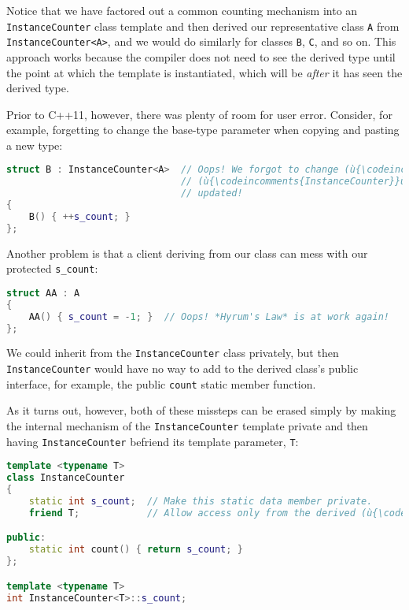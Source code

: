 \noindent Notice that we have factored out a common counting mechanism into an
\texttt{InstanceCounter} class template and then derived our
representative class \texttt{A} from \texttt{InstanceCounter<A>}, and we
would do similarly for classes \texttt{B}, \texttt{C}, and so on. This
approach works because the compiler does not need to see the derived
type until the point at which the template is instantiated, which will
be \emph{after} it has seen the derived type.

Prior to C++11, however, there was plenty of room for user error.
Consider, for example, forgetting to change the base-type parameter when
copying and pasting a new type:

\begin{lstlisting}[language=C++]
struct B : InstanceCounter<A>  // Oops! We forgot to change (ù{\codeincomments{A}}ù) to (ù{\codeincomments{B}}ù) in
                               // (ù{\codeincomments{InstanceCounter}}ù): The wrong count will be
                               // updated!
{
    B() { ++s_count; }
};
\end{lstlisting}
    
\noindent Another problem is that a client deriving from our class can mess with
our protected \texttt{s\_count}:

\begin{lstlisting}[language=C++]
struct AA : A
{
    AA() { s_count = -1; }  // Oops! *Hyrum's Law* is at work again!
};
\end{lstlisting}
    
\noindent We could inherit from the \texttt{InstanceCounter} class privately, but
then \texttt{InstanceCounter} would have no way to add to the derived
class's public interface, for example, the public \texttt{count} static
member function.

As it turns out, however, both of these missteps can be erased simply by
making the internal mechanism of the \texttt{InstanceCounter} template
private and then having \mbox{\texttt{InstanceCounter}} befriend its template
parameter, \texttt{T}:

\begin{lstlisting}[language=C++]
template <typename T>
class InstanceCounter
{
    static int s_count;  // Make this static data member private.
    friend T;            // Allow access only from the derived (ù{\codeincomments{T}}ù).

public:
    static int count() { return s_count; }
};

template <typename T>
int InstanceCounter<T>::s_count;
\end{lstlisting}
    
